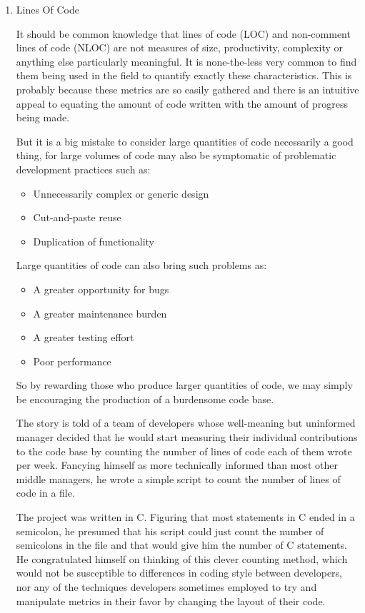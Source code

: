 \documentclass{article}
\begin{document}
\begin{enumerate}
\begin{enumerate}
\item Lines Of Code
\label{sec:orgheadline166}

It should be common knowledge that lines of code (LOC) and non-comment
lines of code (NLOC) are not measures of size, productivity, complexity
or anything else particularly meaningful. It is none-the-less very
common to find them being used in the field to quantify exactly these
characteristics. This is probably because these metrics are so easily
gathered and there is an intuitive appeal to equating the amount of code
written with the amount of progress being made.

But it is a big mistake to consider large quantities of code necessarily
a good thing, for large volumes of code may also be symptomatic of
problematic development practices such as:

\begin{itemize}
\item Unnecessarily complex or generic design
\item Cut-and-paste reuse
\item Duplication of functionality
\end{itemize}

Large quantities of code can also bring such problems as:

\begin{itemize}
\item A greater opportunity for bugs
\item A greater maintenance burden
\item A greater testing effort
\item Poor performance
\end{itemize}

So by rewarding those who produce larger quantities of code, we may
simply be encouraging the production of a burdensome code base.

The story is told of a team of developers whose well-meaning but
uninformed manager decided that he would start measuring their
individual contributions to the code base by counting the number of
lines of code each of them wrote per week. Fancying himself as more
technically informed than most other middle managers, he wrote a simple
script to count the number of lines of code in a file.

The project was written in C. Figuring that most statements in C ended
in a semicolon, he presumed that his script could just count the number
of semicolons in the file and that would give him the number of C
statements. He congratulated himself on thinking of this clever counting
method, which would not be susceptible to differences in coding style
between developers, nor any of the techniques developers sometimes
employed to try and manipulate metrics in their favor by changing the
layout of their code.


\end{enumerate}
\end{enumerate}
\end{document}
